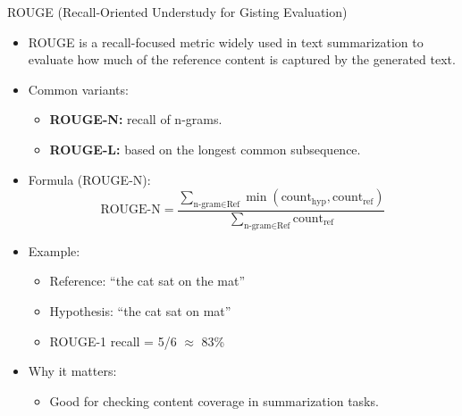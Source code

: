 \begin{frame}[allowframebreaks]{ROUGE (Recall-Oriented Understudy for Gisting Evaluation)}

\begin{itemize}
    \item ROUGE is a recall-focused metric widely used in text summarization to evaluate how much of the reference content is captured by the generated text.

    \item Common variants:
    \begin{itemize}
        \item \textbf{ROUGE-N:} recall of n-grams.
        \item \textbf{ROUGE-L:} based on the longest common subsequence.
    \end{itemize}

    \item Formula (ROUGE-N):
    \[
        \text{ROUGE-N} = \frac{\sum_{\text{n-gram} \in \text{Ref}} \min(\text{count}_{\text{hyp}}, \text{count}_{\text{ref}})}{\sum_{\text{n-gram} \in \text{Ref}} \text{count}_{\text{ref}}}
    \]
\framebreak
    \item Example:
    \begin{itemize}
        \item Reference: ``the cat sat on the mat''
        \item Hypothesis: ``the cat sat on mat''
        \item ROUGE-1 recall = 5/6 $\approx$ 83\%
    \end{itemize}

    \item Why it matters:
    \begin{itemize}
        \item Good for checking content coverage in summarization tasks.
    \end{itemize}
\end{itemize}

\end{frame}



